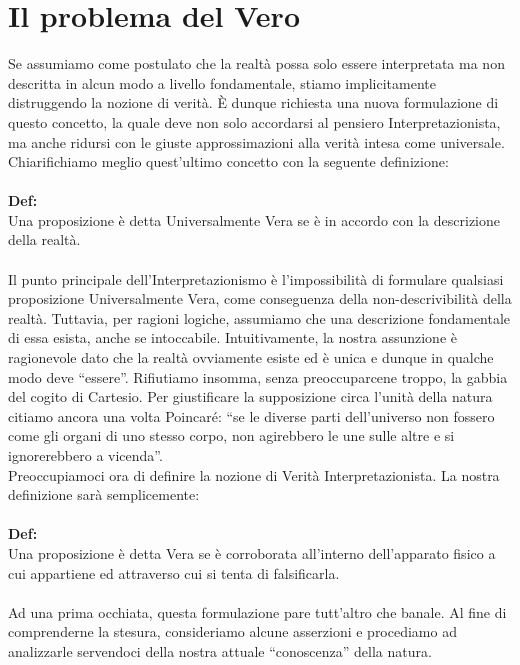 \documentclass[]{article}
\begin{document}
	\section{Il problema del Vero}
	Se assumiamo come postulato che la realtà possa solo essere interpretata ma non descritta in alcun modo a livello fondamentale, stiamo implicitamente distruggendo la nozione di verità. \`E dunque richiesta  una nuova formulazione di questo concetto, la quale deve non solo accordarsi al pensiero Interpretazionista, ma anche ridursi con le giuste approssimazioni alla verità intesa come universale.
	Chiarifichiamo meglio quest'ultimo concetto con la seguente definizione:\\\\
	\textbf{Def:}\\
	Una proposizione è detta Universalmente Vera se è in accordo con la descrizione della realtà.\\
	\\
	Il punto principale dell'Interpretazionismo è l'impossibilità di formulare qualsiasi proposizione Universalmente Vera, come conseguenza della non-descrivibilità della realtà. Tuttavia, per ragioni logiche, assumiamo che una descrizione fondamentale di essa esista, anche se intoccabile. Intuitivamente, la nostra assunzione è ragionevole dato che la realtà ovviamente esiste ed è unica e dunque in qualche modo deve \enquote{essere}. Rifiutiamo insomma, senza preoccuparcene troppo, la gabbia del cogito di Cartesio. Per giustificare la supposizione circa l'unità della natura citiamo ancora una volta Poincaré: \enquote{se le diverse parti dell'universo non fossero come gli organi di uno stesso corpo, non agirebbero le une sulle altre e si ignorerebbero a vicenda}.\\
	Preoccupiamoci ora di definire la nozione di Verità Interpretazionista. La nostra definizione sarà semplicemente:\\
	\\
	\textbf{Def:}\\
	Una proposizione è detta Vera se è corroborata all'interno dell'apparato fisico a cui appartiene ed attraverso cui si tenta di falsificarla.\\
	\\
	Ad una prima occhiata, questa formulazione pare tutt'altro che banale. Al fine di comprenderne la stesura, consideriamo alcune asserzioni e procediamo ad analizzarle servendoci della nostra attuale \enquote{conoscenza} della natura.\\
\end{document}
